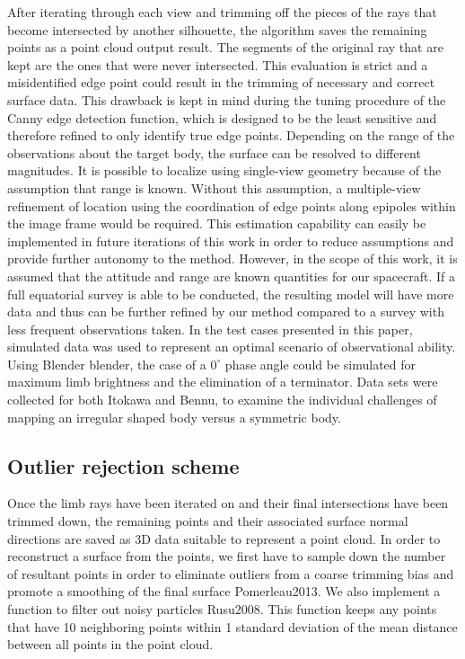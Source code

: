 \indent After iterating through each view and trimming off the pieces of the rays that become intersected by another silhouette, the algorithm saves the remaining points as a point cloud output result. The segments of the original ray that are kept are the ones that were never intersected. This evaluation is strict and a misidentified edge point could result in the trimming of necessary and correct surface data. This drawback is kept in mind during the tuning procedure of the Canny edge detection function, which is designed to be the least sensitive and therefore refined to only identify true edge points. Depending on the range of the observations about the target body, the surface can be resolved to different magnitudes. It is possible to localize using single-view geometry because of the assumption that range is known. Without this assumption, a multiple-view refinement of location using the coordination of edge points along epipoles within the image frame would be required. This estimation capability can easily be implemented in future iterations of this work in order to reduce assumptions and provide further autonomy to the method. However, in the scope of this work, it is assumed that the attitude and range are known quantities for our spacecraft. If a full equatorial survey is able to be conducted, the resulting model will have more data and thus can be further refined by our method compared to a survey with less frequent observations taken. In the test cases presented in this paper, simulated data was used to represent an optimal scenario of observational ability. Using Blender {blender}, the case of a $0^\circ$ phase angle could be simulated for maximum limb brightness and the elimination of a terminator. Data sets were collected for both Itokawa and Bennu, to examine the individual challenges of mapping an irregular shaped body versus a symmetric body. 

\subsection{Outlier rejection scheme}
Once the limb rays have been iterated on and their final intersections have been trimmed down, the remaining points and their associated surface normal directions are saved as 3D data suitable to represent a point cloud. In order to reconstruct a surface from the points, we first have to sample down the number of resultant points in order to eliminate outliers from a coarse trimming bias and promote a smoothing of the final surface {Pomerleau2013}. We also implement a function to filter out noisy particles {Rusu2008}. This function keeps any points that have 10 neighboring points within 1 standard deviation of the mean distance between all points in the point cloud.

